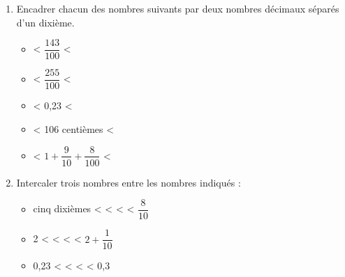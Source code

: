 \begin{activite}
\begin{enumerate}
\begin{spacing}{1.6}
\begin{multicols}{2}
                \end{multicols}
            \end{spacing}
            \vspace*{-3mm}
             \item Encadrer chacun des nombres suivants par deux nombres décimaux séparés d'un dixième.
             \begin{spacing}{1.6}
                \begin{multicols}{2}
                    \begin{itemize}
                        \item \makebox[0.2\linewidth]{\dotfill} < $\dfrac{143}{100}$ <               \makebox[0.2\linewidth]{\dotfill}
                        \item \makebox[0.2\linewidth]{\dotfill} < $\dfrac{255}{100}$ <               \makebox[0.2\linewidth]{\dotfill}
                        \item \makebox[0.2\linewidth]{\dotfill} < 0,23 <                             \makebox[0.2\linewidth]{\dotfill}
                        \item \makebox[0.2\linewidth]{\dotfill} < {\small 106 centièmes} <           \makebox[0.2\linewidth]{\dotfill}
                        \item \makebox[0.2\linewidth]{\dotfill} < $1+\dfrac{9}{10}+\dfrac{8}{100}$ < \makebox[0.2\linewidth]{\dotfill}
                    \end{itemize}
                \end{multicols}
            \end{spacing}
            \vspace*{-3mm}
             \item Intercaler trois nombres entre les nombres indiqués : 
             \begin{spacing}{1}
                \begin{itemize}
                    \item cinq dixièmes <\makebox[0.2\linewidth]{\dotfill} < \makebox[0.2\linewidth]{\dotfill} < \makebox[0.2\linewidth]{\dotfill} < $\dfrac{8}{10}$\\
                    \item 2             <\makebox[0.2\linewidth]{\dotfill} < \makebox[0.2\linewidth]{\dotfill} < \makebox[0.2\linewidth]{\dotfill} < $2+\dfrac{1}{10}$\\
                    \item 0,23          <\makebox[0.2\linewidth]{\dotfill} < \makebox[0.2\linewidth]{\dotfill} < \makebox[0.2\linewidth]{\dotfill} < 0,3
                \end{itemize}
            \end{spacing}
          \end{enumerate}
 \end{activite}
 